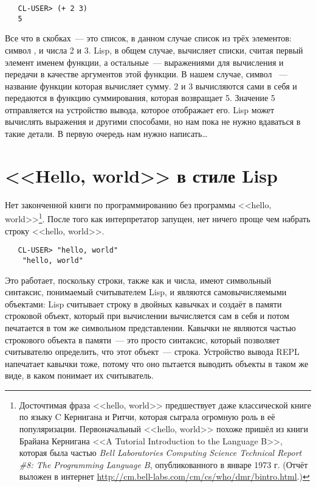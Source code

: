 \begin{verbatim}
   CL-USER> (+ 2 3)
   5
\end{verbatim}

Все что в скобках~--- это список, в данном случае список из трёх элементов: символ \code{+},
и числа 2 и 3. Lisp, в общем случае, вычисляет списки, считая первый элемент именем
функции, а остальные~--- выражениями для вычисления и передачи в качестве аргументов этой
функции. В нашем случае, символ \code{+}~--- название функции которая вычисляет сумму. 2 и 3
вычисляются сами в себя и передаются в функцию суммирования, которая возвращает
5. Значение 5 отправляется на устройство вывода, которое отображает его. Lisp может
вычислять выражения и другими способами, но нам пока не нужно вдаваться в такие детали.
В первую очередь нам нужно написать\ldots

\section{<<Hello, world>> в стиле Lisp}

Нет законченной книги по программированию без программы <<hello,
world>>\footnote{Досточтимая фраза <<hello, world>> предшествует даже классической книге по
  языку C Кернигана и Ритчи, которая сыграла огромную роль в её
  популяризации. Первоначальный <<hello, world>> похоже пришёл из книги Брайана Кернигана <<A
  Tutorial Introduction to the Language B>>, которая была частью \emph{Bell Laboratories
  Computing Science Technical Report \#8: The Programming Language B}, опубликованного в
  январе 1973 г. (Отчёт выложен в интернет
  \url{http://cm.bell-labs.com/cm/cs/who/dmr/bintro.html}.) }. После того как
интерпретатор запущен, нет ничего проще чем набрать строку <<hello, world>>.

\begin{verbatim}
   CL-USER> "hello, world"
    "hello, world"
\end{verbatim}

Это работает, поскольку строки, также как и числа, имеют символьный синтаксис, понимаемый
считывателем Lisp, и являются самовычисляемыми объектами: Lisp считывает строку в
двойных кавычках и создаёт в памяти строковой объект, который при вычислении вычисляется
сам в себя и потом печатается в том же символьном представлении. Кавычки не являются
частью строкового объекта в памяти~--- это просто синтаксис, который позволяет считывателю
определить, что этот объект~--- строка. Устройство вывода REPL напечатает кавычки тоже,
потому что оно пытается выводить объекты в таком же виде, в каком понимает их считыватель.

